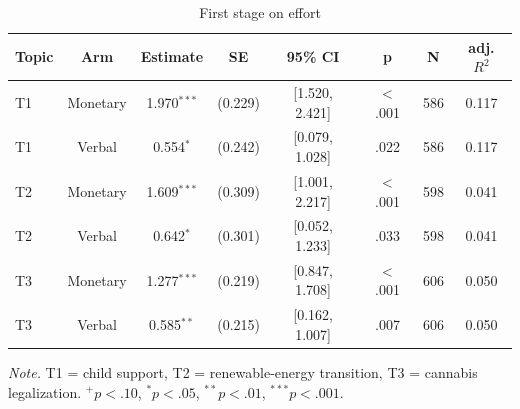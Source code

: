 \begin{table}[htbp]
\centering
\begin{threeparttable}
\caption{First stage on effort}
\label{tab:tab_first_stage_effort}
\begin{tabular}{lccccccc}
\toprule
  Topic & Arm & Estimate & SE & 95\% CI & p & N & adj. $R^2$ \\
\midrule
  T1 & Monetary & 1.970$^{***}$ & (0.229) & [1.520, 2.421] & $<$.001 & 586 & 0.117 \\
  T1 & Verbal & 0.554$^{*}$ & (0.242) & [0.079, 1.028] & .022 & 586 & 0.117 \\
  T2 & Monetary & 1.609$^{***}$ & (0.309) & [1.001, 2.217] & $<$.001 & 598 & 0.041 \\
  T2 & Verbal & 0.642$^{*}$ & (0.301) & [0.052, 1.233] & .033 & 598 & 0.041 \\
  T3 & Monetary & 1.277$^{***}$ & (0.219) & [0.847, 1.708] & $<$.001 & 606 & 0.050 \\
  T3 & Verbal & 0.585$^{**}$ & (0.215) & [0.162, 1.007] & .007 & 606 & 0.050 \\
\bottomrule
\end{tabular}
\begin{tablenotes}\footnotesize\item \textit{Note.} T1 = child support, T2 = renewable-energy transition, T3 = cannabis legalization. $^{+}p<.10$, $^{*}p<.05$, $^{**}p<.01$, $^{***}p<.001$.\end{tablenotes}
\end{threeparttable}
\end{table}

